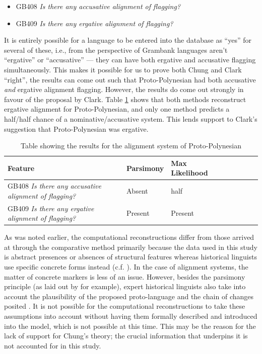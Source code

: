 \documentclass[draft,10pt]{article} %
\begin{document}
\begin{itemize}
\item GB408 \emph{Is there any accusative alignment of flagging?}
\item GB409 \emph{Is there any ergative alignment of flagging?}
\end{itemize}

It is entirely possible for a language to be entered into the database as ``yes'' for several of these, i.e., from the perspective of Grambank languages aren't ``ergative'' or ``accusative'' --- they can have both ergative and accusative flagging simultaneously. This makes it possible for us to prove both Chung and Clark ``right'', the results can come out such that Proto-Polynesian had both accusative \emph{and} ergative alignment flagging. However, the results do come out strongly in favour of the proposal by Clark. Table \ref{proto_poly_erg_table} shows that both methods reconstruct ergative alignment for Proto-Polynesian, and only one method predicts a half/half chance of a nominative/accusative system. This lends support to Clark's suggestion that Proto-Polynesian was ergative.

\begin{table}[H]
\centering
\caption{Table showing the results for the alignment system of Proto-Polynesian}
\label{proto_poly_erg_table}
\begin{tabular}{|l|l|l|l|l|l|l|l|}
\hline
Feature & \textbf{Parsimony}& \textbf{Max Likelihood} \\ \hline
GB408 \emph{Is there any accusative alignment of flagging?} &Absent & half \\
GB409 \emph{Is there any ergative alignment of flagging?} & Present & Present \\
\end{tabular}
\end{table}

As was noted earlier, the computational reconstructions differ from those arrived at through the comparative method primarily because the data used in this study is abstract presences or absences of structural features whereas historical linguists use specific concrete forms instead (c.f. \citet{crowley1985common}). In the case of alignment systems, the matter of concrete markers is less of an issue. However, besides the parsimony principle (as laid out by \citet[19]{clark1976aspects} for example), expert historical linguists also take into account the plausibility of the proposed proto-language and the chain of changes posited \citep{chung1977aspects}. It is not possible for the computational reconstructions to take these assumptions into account without having them formally described and introduced into the model, which is not possible at this time. This may be the reason for the lack of support for Chung's theory; the crucial information that underpins it is not accounted for in this study.
\end{document}
